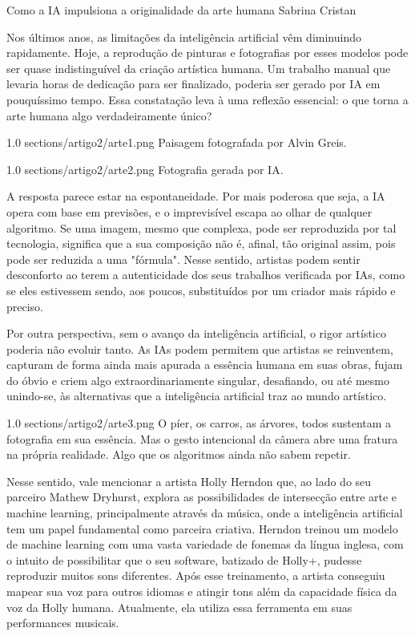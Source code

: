 \hypearticle
{Como a IA impulsiona a originalidade da arte humana}
{Sabrina Cristan}
{

\hspace*{1.5em} Nos últimos anos, as limitações da 
inteligência 
artificial 
vêm diminuindo 
rapidamente. Hoje, a reprodução de pinturas 
e fotografias por esses modelos pode ser 
quase indistinguível da criação artística 
humana. Um trabalho manual que levaria 
horas de dedicação para ser finalizado, 
poderia ser gerado por IA em pouquíssimo 
tempo. Essa constatação leva à uma reflexão 
essencial: o que torna a arte humana algo 
verdadeiramente único? 

\articleimage
{1.0}
{sections/artigo2/arte1.png}
{Paisagem fotografada por Alvin Greis.}

\articleimage
{1.0}
{sections/artigo2/arte2.png}
{Fotografia gerada por IA.}

\subtitle{Espontaneidade como essência}

\hspace*{1.5em} A resposta parece estar na 
espontaneidade. Por mais poderosa que seja, 
a IA opera com base em previsões, e o 
imprevisível escapa ao olhar de qualquer 
algoritmo. Se uma imagem, mesmo que 
complexa, pode ser reproduzida por tal 
tecnologia, significa que a sua composição 
não é, afinal, tão original assim, pois pode ser 
reduzida a uma "fórmula".  
\hspace*{1.5em} Nesse sentido, artistas podem sentir 
desconforto ao terem a autenticidade dos 
seus trabalhos verificada por IAs, como se eles 
estivessem sendo, aos poucos, substituídos 
por um criador mais rápido e preciso. 

\subtitle{Parceria criativa}
\hspace*{1.5em} Por outra perspectiva, sem o avanço da 
inteligência artificial, o rigor artístico poderia 
não evoluir tanto. As IAs podem permitem que 
artistas se reinventem, capturam de forma 
ainda mais apurada a essência humana em 
suas obras, fujam do óbvio e criem algo 
extraordinariamente singular, desafiando, ou 
até mesmo unindo-se, às alternativas que a 
inteligência artificial traz ao mundo artístico. 

\articleimage
{1.0}
{sections/artigo2/arte3.png}
{O píer, os carros, as árvores, todos sustentam a fotografia em sua essência. Mas o gesto intencional da câmera abre uma fratura na própria realidade. Algo que os algoritmos ainda não sabem repetir.}

\hspace*{1.5em} Nesse sentido, vale mencionar a artista 
Holly Herndon que, ao lado do seu parceiro 
Mathew Dryhurst, explora as possibilidades de 
intersecção entre arte e machine learning, 
principalmente através da música, onde a 
inteligência 
artificial 
tem um papel 
fundamental como parceira criativa. Herndon 
treinou um modelo de machine learning com 
uma vasta variedade de fonemas da língua 
inglesa, com o intuito de possibilitar que o seu 
software, batizado de Holly+, pudesse 
reproduzir muitos sons diferentes. Após esse 
treinamento, a artista conseguiu mapear sua 
voz para outros idiomas e atingir tons além da 
capacidade física da voz da Holly humana. 
Atualmente, ela utiliza essa ferramenta em 
suas performances musicais.


}
